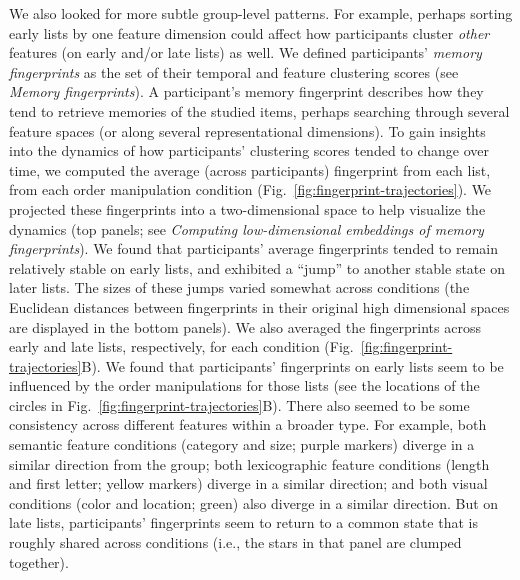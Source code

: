 \documentclass[11pt]{article}
\begin{document}
We also looked for more subtle group-level patterns. For example, perhaps
sorting early lists by one feature dimension could affect how participants
cluster \textit{other} features (on early and/or late lists) as well. We
defined participants' \textit{memory fingerprints} as the set of their temporal
and feature clustering scores (see \textit{Memory fingerprints}). A
participant's memory fingerprint describes how they tend to retrieve memories
of the studied items, perhaps searching through several feature spaces (or
along several representational dimensions). To gain insights into the dynamics
of how participants' clustering scores tended to change over time, we computed
the average (across participants) fingerprint from each list, from each order
manipulation condition (Fig.~\ref{fig:fingerprint-trajectories}). We projected
these fingerprints into a two-dimensional space to help visualize the dynamics
(top panels; see \textit{Computing low-dimensional embeddings of memory
fingerprints}). We found that participants' average fingerprints tended to
remain relatively stable on early lists, and exhibited a ``jump'' to another
stable state on later lists. The sizes of these jumps varied somewhat across
conditions (the Euclidean distances between fingerprints in their original high
dimensional spaces are displayed in the bottom panels). We also averaged the
fingerprints across early and late lists, respectively, for each condition
(Fig.~\ref{fig:fingerprint-trajectories}B). We found that participants'
fingerprints on early lists seem to be influenced by the order manipulations
for those lists (see the locations of the circles in
Fig.~\ref{fig:fingerprint-trajectories}B). There also seemed to be some
consistency across different features within a broader type. For example, both
semantic feature conditions (category and size; purple markers) diverge in a
similar direction from the group; both lexicographic feature conditions (length
and first letter; yellow markers) diverge in a similar direction; and both
visual conditions (color and location; green) also diverge in a similar
direction. But on late lists, participants' fingerprints seem to return to a
common state that is roughly shared across conditions (i.e., the stars in that
panel are clumped together).
\end{document}
